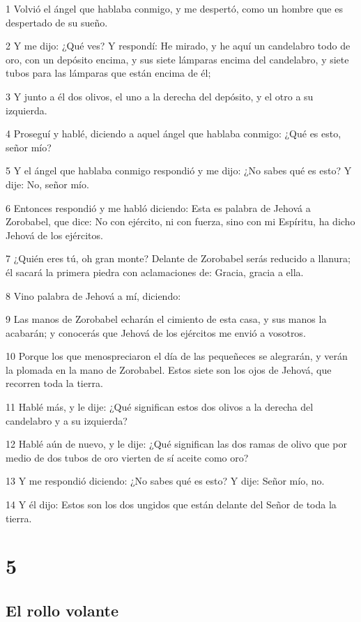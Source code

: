 \par 1 Volvió el ángel que hablaba conmigo, y me despertó, como un hombre que es despertado de su sueño.
\par 2 Y me dijo: ¿Qué ves? Y respondí: He mirado, y he aquí un candelabro todo de oro, con un depósito encima, y sus siete lámparas encima del candelabro, y siete tubos para las lámparas que están encima de él;
\par 3 Y junto a él dos olivos, el uno a la derecha del depósito, y el otro a su izquierda.
\par 4 Proseguí y hablé, diciendo a aquel ángel que hablaba conmigo: ¿Qué es esto, señor mío?
\par 5 Y el ángel que hablaba conmigo respondió y me dijo: ¿No sabes qué es esto? Y dije: No, señor mío.
\par 6 Entonces respondió y me habló diciendo: Esta es palabra de Jehová a Zorobabel, que dice: No con ejército, ni con fuerza, sino con mi Espíritu, ha dicho Jehová de los ejércitos.
\par 7 ¿Quién eres tú, oh gran monte? Delante de Zorobabel serás reducido a llanura; él sacará la primera piedra con aclamaciones de: Gracia, gracia a ella.
\par 8 Vino palabra de Jehová a mí, diciendo:
\par 9 Las manos de Zorobabel echarán el cimiento de esta casa, y sus manos la acabarán; y conocerás que Jehová de los ejércitos me envió a vosotros.
\par 10 Porque los que menospreciaron el día de las pequeñeces se alegrarán, y verán la plomada en la mano de Zorobabel. Estos siete son los ojos de Jehová, que recorren toda la tierra.
\par 11 Hablé más, y le dije: ¿Qué significan estos dos olivos a la derecha del candelabro y a su izquierda?
\par 12 Hablé aún de nuevo, y le dije: ¿Qué significan las dos ramas de olivo que por medio de dos tubos de oro vierten de sí aceite como oro?
\par 13 Y me respondió diciendo: ¿No sabes qué es esto? Y dije: Señor mío, no.
\par 14 Y él dijo: Estos son los dos ungidos que están delante del Señor de toda la tierra.

\chapter{5}

\section*{El rollo volante}

